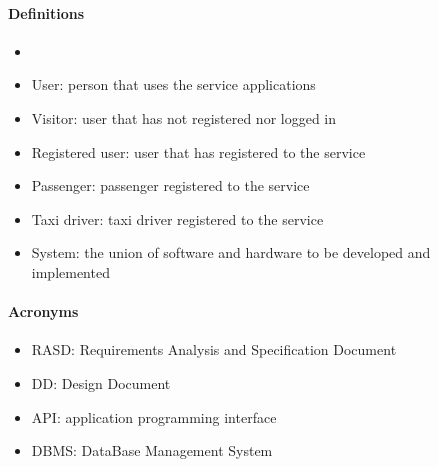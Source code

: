 \paragraph{Definitions}
\begin{itemize}
	\item 
	\item User: person that uses the service applications
	\item Visitor: user that has not registered nor logged in
	\item Registered user: user that has registered to the service
	\item Passenger: passenger registered to the service
	\item Taxi driver: taxi driver registered to the service
	\item System: the union of software and hardware to be developed and implemented
\end{itemize}
\paragraph{Acronyms}
\begin{itemize}
	\item RASD: Requirements Analysis and Specification Document
	\item DD: Design Document
	\item API: application programming interface
	\item DBMS: DataBase Management System
\end{itemize}